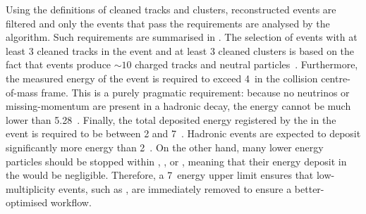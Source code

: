 \begin{table}[hbtp!]
    \centering
     \caption{\label{tab:fei_objects} Definitions for objects used in \FEI selections.}
\end{table}
Using the definitions of cleaned tracks and \ECL clusters, reconstructed events are filtered and only the events that pass the requirements are analysed by the \FEI algorithm.
Such requirements are summarised in .
The selection of events with at least 3 cleaned tracks in the event and at least 3 cleaned \ECL clusters is based on the fact that \BB events produce $\sim10$ charged tracks and neutral particles~\cite{BaBar:2014omp}.
Furthermore, the measured energy of the event is required to exceed 4~\gev in the \epem collision centre-of-mass frame.
This is a purely pragmatic requirement: because no neutrinos or missing-momentum are present in a hadronic decay, the energy cannot be much lower than 5.28~\gev.
Finally, the total deposited energy registered by the \ECL in the event is required to be between 2 and 7~\gev.
Hadronic events are expected to deposit significantly more energy than 2~\gev.
On the other hand, many lower energy particles should be stopped within \PXD, \SVD, \CDC or \TOP, meaning that their energy deposit in the \ECL would be negligible.
Therefore, a 7~\gev \ECL energy upper limit ensures that low-multiplicity events, such as \epem\ra\epem, are immediately removed to ensure a better-optimised workflow.
\begin{table}[hbtp!]
    \centering
     \caption{\label{tab:fei_precuts} Selections applied before running the \FEI algorithm.
     Cleaned tracks and clusters are defined in .
     }
\end{table}

